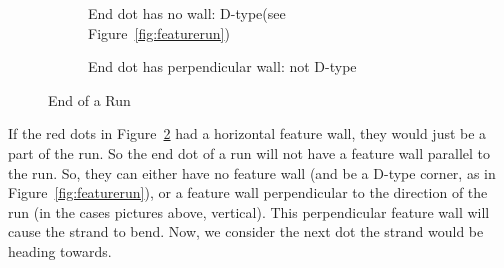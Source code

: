 \documentclass[openany]{book}
\begin{document}
\begin{figure}[H]
\begin{subfigure}[t]{.49\textwidth}
		\centering
{}
\caption{End dot has no wall: D-type(see Figure~\ref{fig:featurerun})}
\end{subfigure}
\hspace{1cm}
\begin{subfigure}[t]{.49\textwidth}
		\centering
{}
\caption{End dot has perpendicular wall: not D-type}\label{sfig:perpwallgroup}
\end{subfigure}
\qquad
\caption{End of a Run}\label{fig:endrun}
\end{figure}
If the red dots in Figure~\ref{fig:endrun} had a horizontal feature wall, they would just be a part of the run. So the end dot of a run will not have a feature wall parallel to the run.  So, they can either have no feature wall (and be a D-type corner, as in Figure~\ref{fig:featurerun}), or a feature wall perpendicular to the direction of the run (in the cases pictures above, vertical). This perpendicular feature wall will cause the strand to bend. Now, we consider the next dot the strand would be heading towards.
\end{document}
